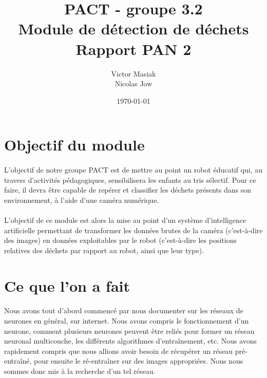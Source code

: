 \documentclass[12pt,a4paper,twocolumn]{article}
\begin{document}
\title{PACT - groupe 3.2\\Module de détection de déchets\\Rapport PAN 2}
\author{Victor Masiak\\ Nicolas Jow}
\date{\today}

\maketitle

\section{Objectif du module}

\paragraph*{}

L'objectif de notre groupe PACT est de mettre au point un robot éducatif qui, au travers d'activités pédagogiques, sensibilisera les enfants au tris sélectif. Pour ce faire, il devra être capable de repérer et classifier les déchets présents dans son environnement, à l’aide d’une caméra numérique.

\paragraph*{}

L’objectif de ce module est alors la mise au point d’un système d’intelligence artificielle permettant de transformer les données brutes de la caméra (c'est-à-dire des images) en données exploitables par le robot (c'est-à-dire les positions relatives des déchets par rapport au robot, ainsi que leur type).


\section{Ce que l'on a fait}

\paragraph*{}

Nous avons tout d’abord commencé par nous documenter sur les réseaux de neurones en général, sur internet. Nous avons compris le fonctionnement d’un neurone, comment plusieurs neurones peuvent être reliés pour former un réseau neuronal multicouche, les différents algorithmes d'entraînement, etc.
Nous avons rapidement compris que nous allions avoir besoin de récupérer un réseau pré-entraîné, pour ensuite le ré-entraîner sur des images appropriées. Nous nous sommes donc mis à la recherche d’un tel réseau.
\end{document}
